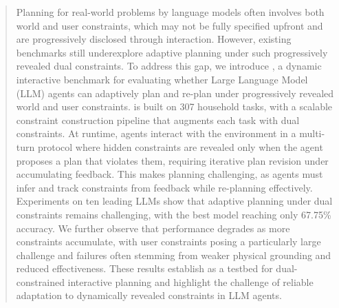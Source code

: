 \begin{abstract}

Planning for real-world problems by language models often involves both world and user constraints, which may not be fully specified upfront and are progressively disclosed through interaction. 
However, existing benchmarks still underexplore adaptive planning under such progressively revealed dual constraints.
To address this gap, we introduce \BENCH{}, a dynamic interactive benchmark for evaluating whether Large Language Model (LLM) agents can adaptively plan and re-plan under progressively revealed world and user constraints.
\bench{} is built on 307 household tasks, with a scalable constraint construction pipeline that augments each task with dual constraints.
At runtime, agents interact with the environment in a multi-turn protocol where hidden constraints are revealed only when the agent proposes a plan that violates them, requiring iterative plan revision under accumulating feedback. 
This makes planning challenging, as agents must infer and track constraints from feedback while re-planning effectively.
Experiments on ten leading LLMs show that adaptive planning under dual constraints remains challenging, with the best model reaching only 67.75\% accuracy.
We further observe that performance degrades as more constraints accumulate, with user constraints posing a particularly large challenge and failures often stemming from weaker physical grounding and reduced effectiveness.
These results establish \bench{} as a testbed for dual-constrained interactive planning and highlight the challenge of reliable adaptation to dynamically revealed constraints in LLM agents. 
\end{abstract}

